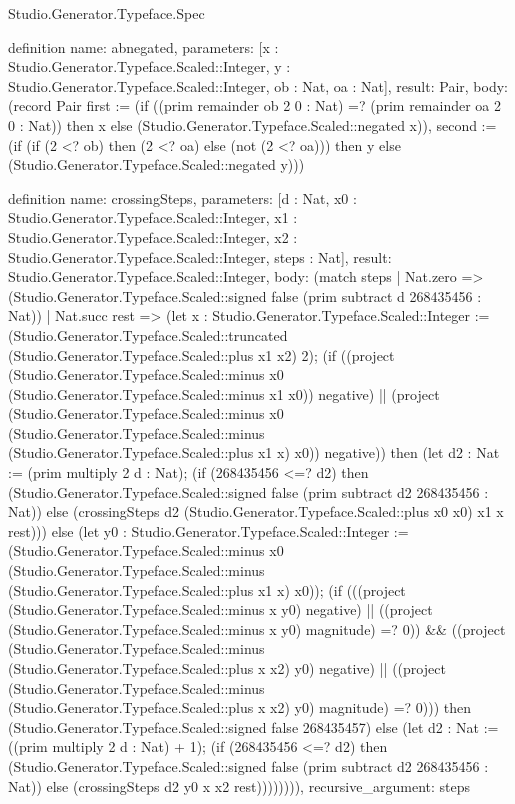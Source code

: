 \begin{lexlean}{Studio.Generator.Typeface.Spec}
\begin{semanticmodule}
definition{
  name: abnegated,
  parameters: [x : Studio.Generator.Typeface.Scaled::Integer, y : Studio.Generator.Typeface.Scaled::Integer, ob : Nat, oa : Nat],
  result: Pair,
  body: (record Pair {first := (if ((prim remainder ob 2 0 : Nat) =? (prim remainder oa 2 0 : Nat)) then x else (Studio.Generator.Typeface.Scaled::negated x)), second := (if (if (2 <? ob) then (2 <? oa) else (not (2 <? oa))) then y else (Studio.Generator.Typeface.Scaled::negated y))})
}

definition{
  name: crossingSteps,
  parameters: [d : Nat, x0 : Studio.Generator.Typeface.Scaled::Integer, x1 : Studio.Generator.Typeface.Scaled::Integer, x2 : Studio.Generator.Typeface.Scaled::Integer, steps : Nat],
  result: Studio.Generator.Typeface.Scaled::Integer,
  body: (match steps
    | Nat.zero => (Studio.Generator.Typeface.Scaled::signed false (prim subtract d 268435456 : Nat))
    | Nat.succ rest => (let x : Studio.Generator.Typeface.Scaled::Integer := (Studio.Generator.Typeface.Scaled::truncated (Studio.Generator.Typeface.Scaled::plus x1 x2) 2); (if ((project (Studio.Generator.Typeface.Scaled::minus x0 (Studio.Generator.Typeface.Scaled::minus x1 x0)) negative) || (project (Studio.Generator.Typeface.Scaled::minus x0 (Studio.Generator.Typeface.Scaled::minus (Studio.Generator.Typeface.Scaled::plus x1 x) x0)) negative)) then (let d2 : Nat := (prim multiply 2 d : Nat); (if (268435456 <=? d2) then (Studio.Generator.Typeface.Scaled::signed false (prim subtract d2 268435456 : Nat)) else (crossingSteps d2 (Studio.Generator.Typeface.Scaled::plus x0 x0) x1 x rest))) else (let y0 : Studio.Generator.Typeface.Scaled::Integer := (Studio.Generator.Typeface.Scaled::minus x0 (Studio.Generator.Typeface.Scaled::minus (Studio.Generator.Typeface.Scaled::plus x1 x) x0)); (if (((project (Studio.Generator.Typeface.Scaled::minus x y0) negative) || ((project (Studio.Generator.Typeface.Scaled::minus x y0) magnitude) =? 0)) && ((project (Studio.Generator.Typeface.Scaled::minus (Studio.Generator.Typeface.Scaled::plus x x2) y0) negative) || ((project (Studio.Generator.Typeface.Scaled::minus (Studio.Generator.Typeface.Scaled::plus x x2) y0) magnitude) =? 0))) then (Studio.Generator.Typeface.Scaled::signed false 268435457) else (let d2 : Nat := ((prim multiply 2 d : Nat) + 1); (if (268435456 <=? d2) then (Studio.Generator.Typeface.Scaled::signed false (prim subtract d2 268435456 : Nat)) else (crossingSteps d2 y0 x x2 rest)))))))),
  recursive_argument: steps
}


\end{semanticmodule}
\end{lexlean}
